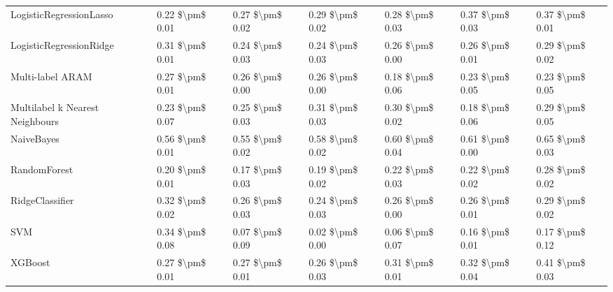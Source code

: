\begin{tabular}{lllllll}
LogisticRegressionLasso         &      0.22 \$\textbackslash pm\$ 0.01 &           0.27 \$\textbackslash pm\$ 0.02 &       0.29 \$\textbackslash pm\$ 0.02 &        0.28 \$\textbackslash pm\$ 0.03 &                         0.37 \$\textbackslash pm\$ 0.03 &  0.37 \$\textbackslash pm\$ 0.01 \\
LogisticRegressionRidge         &      0.31 \$\textbackslash pm\$ 0.01 &           0.24 \$\textbackslash pm\$ 0.03 &       0.24 \$\textbackslash pm\$ 0.03 &        0.26 \$\textbackslash pm\$ 0.00 &                         0.26 \$\textbackslash pm\$ 0.01 &  0.29 \$\textbackslash pm\$ 0.02 \\
Multi-label ARAM                &      0.27 \$\textbackslash pm\$ 0.01 &           0.26 \$\textbackslash pm\$ 0.00 &       0.26 \$\textbackslash pm\$ 0.00 &        0.18 \$\textbackslash pm\$ 0.06 &                         0.23 \$\textbackslash pm\$ 0.05 &  0.23 \$\textbackslash pm\$ 0.05 \\
Multilabel k Nearest Neighbours &      0.23 \$\textbackslash pm\$ 0.07 &           0.25 \$\textbackslash pm\$ 0.03 &       0.31 \$\textbackslash pm\$ 0.03 &        0.30 \$\textbackslash pm\$ 0.02 &                         0.18 \$\textbackslash pm\$ 0.06 &  0.29 \$\textbackslash pm\$ 0.05 \\
NaiveBayes                      &      0.56 \$\textbackslash pm\$ 0.01 &           0.55 \$\textbackslash pm\$ 0.02 &       0.58 \$\textbackslash pm\$ 0.02 &        0.60 \$\textbackslash pm\$ 0.04 &                         0.61 \$\textbackslash pm\$ 0.00 &  0.65 \$\textbackslash pm\$ 0.03 \\
RandomForest                    &      0.20 \$\textbackslash pm\$ 0.01 &           0.17 \$\textbackslash pm\$ 0.03 &       0.19 \$\textbackslash pm\$ 0.02 &        0.22 \$\textbackslash pm\$ 0.03 &                         0.22 \$\textbackslash pm\$ 0.02 &  0.28 \$\textbackslash pm\$ 0.02 \\
RidgeClassifier                 &      0.32 \$\textbackslash pm\$ 0.02 &           0.26 \$\textbackslash pm\$ 0.03 &       0.24 \$\textbackslash pm\$ 0.03 &        0.26 \$\textbackslash pm\$ 0.00 &                         0.26 \$\textbackslash pm\$ 0.01 &  0.29 \$\textbackslash pm\$ 0.02 \\
SVM                             &      0.34 \$\textbackslash pm\$ 0.08 &           0.07 \$\textbackslash pm\$ 0.09 &       0.02 \$\textbackslash pm\$ 0.00 &        0.06 \$\textbackslash pm\$ 0.07 &                         0.16 \$\textbackslash pm\$ 0.01 &  0.17 \$\textbackslash pm\$ 0.12 \\
XGBoost                         &      0.27 \$\textbackslash pm\$ 0.01 &           0.27 \$\textbackslash pm\$ 0.01 &       0.26 \$\textbackslash pm\$ 0.03 &        0.31 \$\textbackslash pm\$ 0.01 &                         0.32 \$\textbackslash pm\$ 0.04 &  0.41 \$\textbackslash pm\$ 0.03 \\
\bottomrule
\end{tabular}
